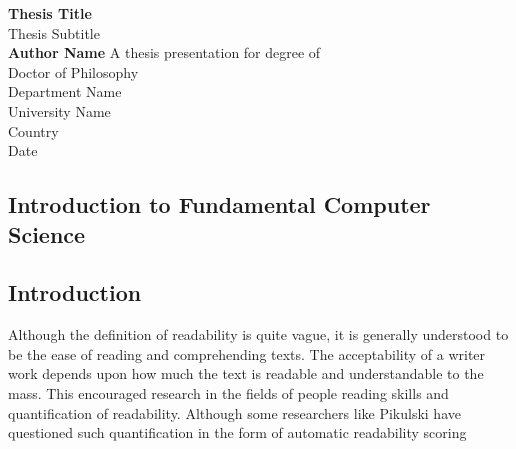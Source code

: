 \documentclass[a4paper,12pt]{book}
\begin{document}
\tableofcontents
\begin{titlepage}
\begin{center}
\vspace*{1cm}
\Huge
\textbf{Thesis Title}\\
\vspace{.5cm}
\LARGE
Thesis Subtitle\\
\vspace{1.5cm}
\textbf{Author Name}
\vfill
A thesis presentation for degree of\\Doctor of Philosophy\\
\vspace{1cm}
\Large
Department Name\\
University Name\\
Country\\
Date
\end{center}
\end{titlepage}
\begin{flushright}
\chapter*{Introduction to Fundamental Computer Science}
\end{flushright}
\section{Introduction}
Although the definition of readability is quite vague, it is generally understood to
be the ease of reading and comprehending texts. The acceptability of a writer
work depends upon how much the text is readable and understandable to the
mass. This encouraged research in the fields of people reading skills and
quantification of readability. Although some researchers like Pikulski 
have questioned such quantification in the form of automatic readability scoring
\end{document}
